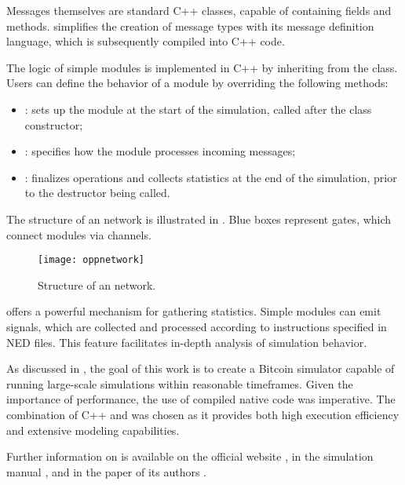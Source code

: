 Messages themselves are standard C++ classes, capable of containing fields and
methods. \omnetpp{} simplifies the creation of message types with its message
definition language, which is subsequently compiled into C++ code.

The logic of simple modules is implemented in C++ by inheriting from the
 class. Users can define the behavior of a module by
overriding the following methods:
\begin{itemize}
	\item {}: sets up the module at the start of the
		simulation, called after the class constructor;
	\item {}: specifies how the module processes
		incoming messages;
	\item {}: finalizes operations and collects statistics at
		the end of the simulation, prior to the destructor being
		called.
\end{itemize}

The structure of an \omnetpp{} network is illustrated in
. Blue boxes represent gates, which connect modules
via channels.

\begin{figure}[tbhp]
	\centering
	\texttt{[image: oppnetwork]}
	\caption{Structure of an \omnetpp{}
	network.}\label{fig:omnetpp-network}
\end{figure}

\omnetpp{} offers a powerful mechanism for gathering statistics. Simple modules
can emit signals, which are collected and processed according to instructions
specified in NED files. This feature facilitates in-depth analysis of
simulation behavior.

As discussed in , the goal of this work is to create a Bitcoin
simulator capable of running large-scale simulations within reasonable
timeframes. Given the importance of performance, the use of compiled native
code was imperative. The combination of C++ and \omnetpp{} was chosen as it
provides both high execution efficiency and extensive modeling capabilities.

Further information on \omnetpp{} is available on the official website
\cite{omnetpp-website}, in the simulation manual
\cite{omnetpp-simulation-manual}, and in the paper of its authors
\cite{omnetpp}.
